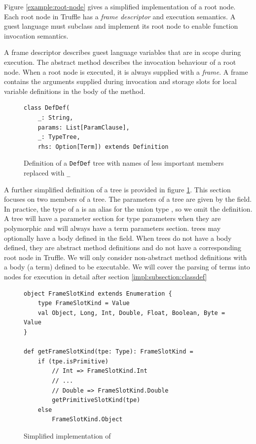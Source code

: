 Figure \ref{example:root-node} gives a simplified implementation of a root node.
Each root node in Truffle has a \textit{frame descriptor} and execution semantics.
A guest language must subclass and implement its root node to enable function invocation semantics.

A frame descriptor describes guest language variables that are in scope during execution.
The abstract  method describes the invocation behaviour of a root node.
When a root node is executed, it is always supplied with a \textit{frame}.
A frame contains the arguments supplied during invocation and storage slots for local variable definitions in the body of the method.

\begin{figure}[!htb]
\begin{verbatim}
class DefDef(
	_: String, 
	params: List[ParamClause], 
	_: TypeTree, 
	rhs: Option[Term]) extends Definition	
\end{verbatim}
\caption{Definition of a \texttt{DefDef} tree with names of less important members replaced with \texttt{\_}}
\label{recall:defdef}
\end{figure}

A further simplified definition of a  tree is provided in figure \ref{recall:defdef}.
This section focuses on two members of a  tree.
The parameters of a  tree are given by the  field.
In practice, the type of a  is an alias for the union type , so we omit the  definition.
A  tree will have a parameter section for type parameters when they are polymorphic and will always have a term parameters section.
 trees may optionally have a body defined in the  field.
When trees do not have a body defined, they are abstract method definitions and do not have a corresponding root node in Truffle.
We will only consider non-abstract method definitions with a body (a term) defined to be executable.
We will cover the parsing of terms into nodes for execution in detail after section \ref{impl:subsection:classdef}

\begin{figure}[!htb]
\begin{verbatim}
object FrameSlotKind extends Enumeration {
	type FrameSlotKind = Value
	val Object, Long, Int, Double, Float, Boolean, Byte = Value
}	
	
def getFrameSlotKind(tpe: Type): FrameSlotKind = 
	if (tpe.isPrimitive) 
		// Int => FrameSlotKind.Int
		// ...
		// Double => FrameSlotKind.Double
		getPrimitiveSlotKind(tpe)
	else  
		FrameSlotKind.Object
\end{verbatim}
\caption{Simplified implementation of }
\label{impl:frameslot-kind}
\end{figure}

